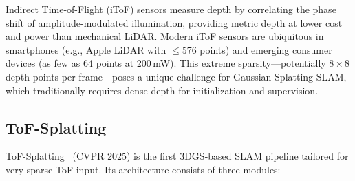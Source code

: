 Indirect Time-of-Flight (iToF) sensors measure depth by correlating the
phase shift of amplitude-modulated illumination, providing metric depth at
lower cost and power than mechanical LiDAR.  Modern iToF sensors are
ubiquitous in smartphones (e.g., Apple LiDAR with $\leq$576 points) and
emerging consumer devices (as few as 64 points at 200\,mW).  This extreme
sparsity---potentially $8\times8$ depth points per frame---poses a unique
challenge for Gaussian Splatting SLAM, which traditionally requires dense
depth for initialization and supervision.

\subsection{ToF-Splatting}

ToF-Splatting~\cite{conti2025_tofsplatting} (CVPR 2025) is the first 3DGS-based
SLAM pipeline tailored for very sparse ToF input.  Its architecture consists
of three modules:


